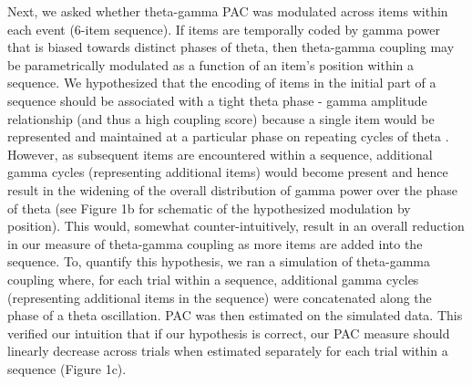 Next, we asked whether theta-gamma PAC was modulated across items within
each event (6-item sequence). If items are temporally coded by gamma
power that is biased towards distinct phases of theta, then theta-gamma
coupling may be parametrically modulated as a function of an item's
position within a sequence. We hypothesized that the encoding of items
in the initial part of a sequence should be associated with a tight
theta phase - gamma amplitude relationship (and thus a high coupling
score) because a single item would be represented and maintained at a
particular phase on repeating cycles of theta
\autocites{jensen_hippocampal_1996}{jensen_hippocampal_1996}. However,
as subsequent items are encountered within a sequence, additional gamma
cycles (representing additional items) would become present and hence
result in the widening of the overall distribution of gamma power over
the phase of theta (see Figure 1b for schematic of the hypothesized
modulation by position). This would, somewhat counter-intuitively,
result in an overall reduction in our measure of theta-gamma coupling as
more items are added into the sequence. To, quantify this hypothesis, we
ran a simulation of theta-gamma coupling where, for each trial within a
sequence, additional gamma cycles (representing additional items in the
sequence) were concatenated along the phase of a theta oscillation. PAC
was then estimated on the simulated data. This verified our intuition
that if our hypothesis is correct, our PAC measure should linearly
decrease across trials when estimated separately for each trial within a
sequence (Figure 1c).

